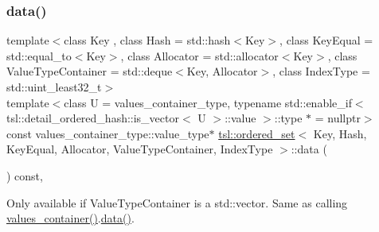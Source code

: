 \subsubsection{\texorpdfstring{data()}{data()}}
{\footnotesize\ttfamily template$<$class Key , class Hash  = std\+::hash$<$\+Key$>$, class Key\+Equal  = std\+::equal\+\_\+to$<$\+Key$>$, class Allocator  = std\+::allocator$<$\+Key$>$, class Value\+Type\+Container  = std\+::deque$<$\+Key, Allocator$>$, class Index\+Type  = std\+::uint\+\_\+least32\+\_\+t$>$ \\
template$<$class U  = values\+\_\+container\+\_\+type, typename std\+::enable\+\_\+if$<$ tsl\+::detail\+\_\+ordered\+\_\+hash\+::is\+\_\+vector$<$ U $>$\+::value $>$\+::type $\ast$  = nullptr$>$ \\
const values\+\_\+container\+\_\+type\+::value\+\_\+type$\ast$ \mbox{\hyperlink{classtsl_1_1ordered__set}{tsl\+::ordered\+\_\+set}}$<$ Key, Hash, Key\+Equal, Allocator, Value\+Type\+Container, Index\+Type $>$\+::data (\begin{DoxyParamCaption}{ }\end{DoxyParamCaption}) const\hspace{0.3cm}{\ttfamily [inline]}, {\ttfamily [noexcept]}}

Only available if Value\+Type\+Container is a std\+::vector. Same as calling \textquotesingle{}\mbox{\hyperlink{classtsl_1_1ordered__set_a1bc951514a5c4c29c14b6cf5177cf1ec}{values\+\_\+container()}}.\mbox{\hyperlink{classtsl_1_1ordered__set_a3ec9980b152c71a875fc4a4e1d7bb78c}{data()}}\textquotesingle{}. \mbox{\label{classtsl_1_1ordered__set_aaf995efb5c45de92a8ef1d35f6e7e28e}} 
